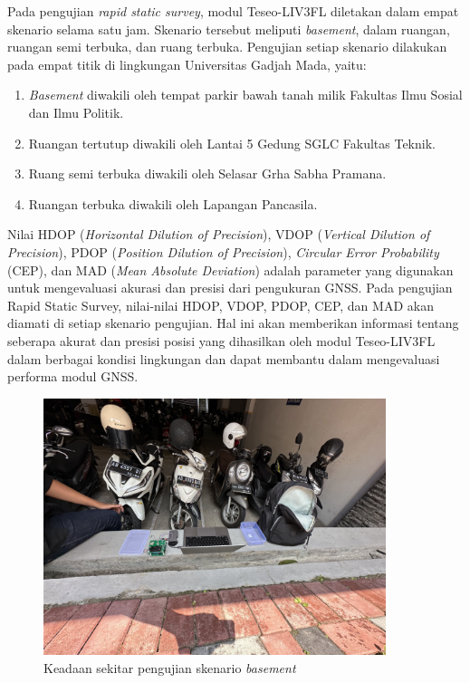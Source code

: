 Pada pengujian \textit{rapid static survey}, modul Teseo\hyp{}LIV3FL diletakan dalam empat skenario selama satu jam. Skenario tersebut meliputi \textit{basement}, dalam ruangan, ruangan semi terbuka, dan ruang terbuka. Pengujian setiap skenario dilakukan pada empat titik di lingkungan Universitas Gadjah Mada, yaitu:

\begin{enumerate}
	\item \textit{Basement} diwakili oleh tempat parkir bawah tanah milik Fakultas Ilmu Sosial dan Ilmu Politik.
	\item Ruangan tertutup diwakili oleh Lantai 5 Gedung SGLC Fakultas Teknik.
	\item Ruang semi terbuka diwakili oleh Selasar Grha Sabha Pramana.
	\item Ruangan terbuka diwakili oleh Lapangan Pancasila.
\end{enumerate}

Nilai HDOP (\textit{Horizontal Dilution of Precision}), VDOP (\textit{Vertical Dilution of Precision}), PDOP (\textit{Position Dilution of Precision}), \textit{Circular Error Probability} (CEP), dan MAD (\textit{Mean Absolute Deviation}) adalah parameter yang digunakan untuk mengevaluasi akurasi dan presisi dari pengukuran GNSS. Pada pengujian Rapid Static Survey, nilai-nilai HDOP, VDOP, PDOP, CEP, dan MAD akan diamati di setiap skenario pengujian. Hal ini akan memberikan informasi tentang seberapa akurat dan presisi posisi yang dihasilkan oleh modul Teseo\hyp{}LIV3FL dalam berbagai kondisi lingkungan dan dapat membantu dalam mengevaluasi performa modul GNSS.

\begin{figure}[H]
	\centering
	\includegraphics[width=10cm]{contents/chapter-4/1-skenario-basement/keadaan.jpg}
	\caption{Keadaan sekitar pengujian skenario \textit{basement}}
	\label{Fig: basement-keadaan}
\end{figure}

